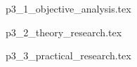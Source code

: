 {
    {p3_1_objective_analysis.tex}
    
    \newpage

    {p3_2_theory_research.tex}

    \newpage

    {p3_3_practical_research.tex}
}
